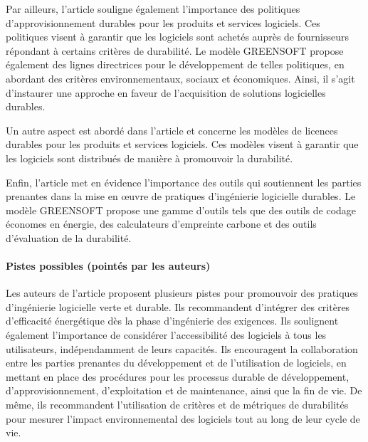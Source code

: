 Par ailleurs, l'article souligne également l'importance des politiques d'approvisionnement durables pour les produits et services logiciels. Ces politiques visent à garantir que les logiciels sont achetés auprès de fournisseurs répondant à certains critères de durabilité. Le modèle GREENSOFT propose également des lignes directrices pour le développement de telles politiques, en abordant des critères environnementaux, sociaux et économiques. Ainsi, il s'agit d'instaurer une approche en faveur de l'acquisition de solutions logicielles durables.

Un autre aspect est abordé dans l'article et concerne les modèles de licences durables pour les produits et services logiciels. Ces modèles visent à garantir que les logiciels sont distribués de manière à promouvoir la durabilité.

Enfin, l'article met en évidence l'importance des outils qui soutiennent les parties prenantes dans la mise en œuvre de pratiques d'ingénierie logicielle durables. Le modèle GREENSOFT propose une gamme d'outils tels que des outils de codage économes en énergie, des calculateurs d'empreinte carbone et des outils d'évaluation de la durabilité.

\paragraph{Pistes possibles (pointés par les auteurs)}
Les auteurs de l'article proposent plusieurs pistes pour promouvoir des pratiques d'ingénierie logicielle verte et durable. Ils recommandent d'intégrer des critères d'efficacité énergétique dès la phase d'ingénierie des exigences. Ils soulignent également l'importance de considérer l'accessibilité des logiciels à tous les utilisateurs, indépendamment de leurs capacités. Ils encouragent la collaboration entre les parties prenantes du développement et de l'utilisation de logiciels, en mettant en place des procédures pour les processus durable de développement, d'approvisionnement, d'exploitation et de maintenance, ainsi que la fin de vie. De même, ils recommandent l'utilisation de critères et de métriques de durabilités pour mesurer l'impact environnemental des logiciels tout au long de leur cycle de vie.

